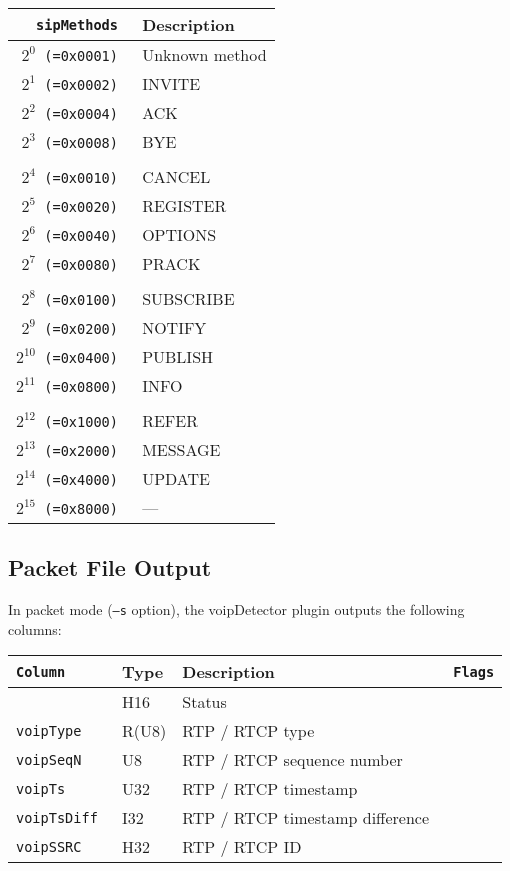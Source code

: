 \documentclass[documentation]{subfiles}
\begin{document}
\begin{longtable}{>{\tt}rl}
    \toprule
    {\bf sipMethods}   & {\bf Description}\\
    \midrule\endhead%
    $2^{0}$  (=0x0001) & Unknown method\\
    $2^{1}$  (=0x0002) & INVITE\\
    $2^{2}$  (=0x0004) & ACK\\
    $2^{3}$  (=0x0008) & BYE\\
    \\
    $2^{4}$  (=0x0010) & CANCEL\\
    $2^{5}$  (=0x0020) & REGISTER\\
    $2^{6}$  (=0x0040) & OPTIONS\\
    $2^{7}$  (=0x0080) & PRACK\\
    \\
    $2^{8}$  (=0x0100) & SUBSCRIBE\\
    $2^{9}$  (=0x0200) & NOTIFY\\
    $2^{10}$ (=0x0400) & PUBLISH\\
    $2^{11}$ (=0x0800) & INFO\\
    \\
    $2^{12}$ (=0x1000) & REFER\\
    $2^{13}$ (=0x2000) & MESSAGE\\
    $2^{14}$ (=0x4000) & UPDATE\\
    $2^{15}$ (=0x8000) & ---\\
    \bottomrule
\end{longtable}

\subsection{Packet File Output}
In packet mode ({\tt --s} option), the voipDetector plugin outputs the following columns:
\begin{longtable}{>{\tt}lll>{\tt\small}l}
    \toprule
    {\bf Column}       & {\bf Type} & {\bf Description}               & {\bf Flags}\\
    \midrule\endhead%
    \nameref{voipStat} & H16        & Status                          & \\
    voipType           & R(U8)      & RTP / RTCP type                 & \\
    voipSeqN           & U8         & RTP / RTCP sequence number      & \\
    voipTs             & U32        & RTP / RTCP timestamp            & \\
    voipTsDiff         & I32        & RTP / RTCP timestamp difference & \\
    voipSSRC           & H32        & RTP / RTCP ID                   & \\
    \bottomrule
\end{longtable}
\end{document}
